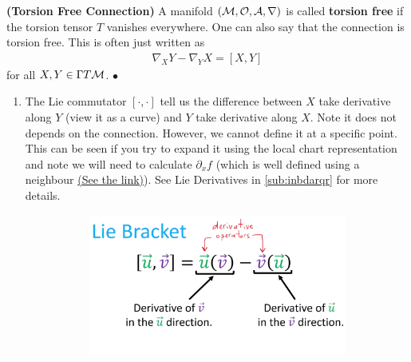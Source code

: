 \documentclass[12pt]{article} %
\newcommand{\bfs}[1]{\textbf{({#1}) }}
\begin{document}
\bd\bfs{Torsion Free Connection}
    A manifold $(\mathcal{M},\mathcal{O},\mathcal{A},\nabla)$ is called \textbf{torsion free} if the torsion tensor $T$ vanishes everywhere. One can also say that the connection is torsion free. This is often just written as 
    \begin{align*}
        \nabla_XY - \nabla_YX = [X,Y]
    \end{align*}
    for all $X,Y\in\Gamma T\mathcal{M}$.
\ed 
$\bullet$ 
\begin{enumerate}
    \item  The Lie commutator $[\cdot,\cdot]$ tell us the difference between $X$ take derivative along $Y$ (view it as a curve) and $Y$ take derivative along $X$. Note it does not depends on the connection. However, we cannot define it at a specific point. This can be seen if you try to expand it using the local chart representation and note we will need to calculate $\partial_x f$ (which is well defined using a neighbour \href{https://math.stackexchange.com/questions/2705586/composition-of-vector-field-regarded-as-sections-of-tangent-bundle}{(See the link)}).
    See Lie Derivatives in \cref{sub:inbdarqr} for more details.
\begin{figure}[h]
     \centering
     \begin{subfigure}[b]{0.4\textwidth}
         \centering
         \includegraphics[width=\textwidth]{Figs/lie_bracket1-min.png}
     \end{subfigure}
     \hfill
     \begin{subfigure}[b]{0.4\textwidth}
         \centering

\end{subfigure}
\end{figure}
\end{enumerate}
\end{document}
